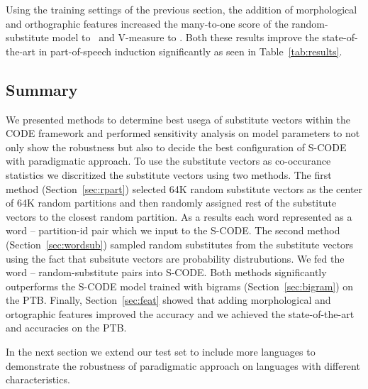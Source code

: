 Using the training settings of the previous section, the addition of
morphological and orthographic features increased the many-to-one
score of the random-substitute model to \ftmto\ and V-measure to
\ftvm.  Both these results improve the state-of-the-art in
part-of-speech induction significantly as seen in
Table~\ref{tab:results}.

\subsection{Summary}
\label{sec:expsum}

We presented methods to determine best usega of substitute vectors
within the CODE framework and performed sensitivity analysis on model
parameters to not only show the robustness but also to decide the best
configuration of S-CODE with paradigmatic approach.  To use the
substitute vectors as co-occurance statistics we discritized the
substitute vectors using two methods.  The first method
(Section~\ref{sec:rpart}) selected 64K random substitute vectors as
the center of 64K random partitions and then randomly assigned rest of
the substitute vectors to the closest random partition.  As a results
each word represented as a word -- partition-id pair which we input to
the S-CODE. The second method (Section~\ref{sec:wordsub}) sampled
random substitutes from the substitute vectors using the fact that
subsitute vectors are probability distrubutions.  We fed the word --
random-substitute pairs into S-CODE.  Both methods significantly
outperforms the S-CODE model trained with bigrams
(Section~\ref{sec:bigram}) on the PTB.  Finally,
Section~\ref{sec:feat} showed that adding morphological and
ortographic features improved the accuracy and we achieved the
state-of-the-art \mto and \vm accuracies on the PTB.

In the next section we extend our test set to include more languages
to demonstrate the robustness of paradigmatic approach on languages
with different characteristics.

